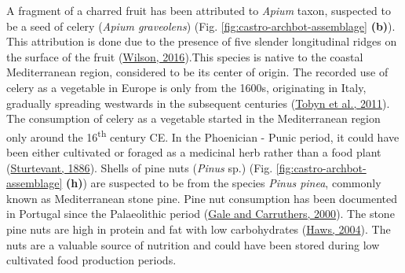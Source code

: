 \documentclass[preprint, 3p, authoryear]{elsarticle} %
\begin{document}
A fragment of a charred fruit has been attributed to \emph{Apium} taxon, suspected to be a seed of celery (\emph{Apium graveolens}) (Fig. \ref{fig:castro-archbot-assemblage} \textbf{(b)}). This attribution is done due to the presence of five slender longitudinal ridges on the surface of the fruit (\protect\hyperlink{ref-wilson16}{Wilson, 2016}).This species is native to the coastal Mediterranean region, considered to be its center of origin. The recorded use of celery as a vegetable in Europe is only from the 1600s, originating in Italy, gradually spreading westwards in the subsequent centuries (\protect\hyperlink{ref-tobyn_etal11}{Tobyn et al., 2011}). The consumption of celery as a vegetable started in the Mediterranean region only around the 16\textsuperscript{th} century CE. In the Phoenician - Punic period, it could have been either cultivated or foraged as a medicinal herb rather than a food plant (\protect\hyperlink{ref-sturtevant86}{Sturtevant, 1886}). Shells of pine nuts (\emph{Pinus} sp.) (Fig. \ref{fig:castro-archbot-assemblage} \textbf{(h)}) are suspected to be from the species \emph{Pinus pinea}, commonly known as Mediterranean stone pine. Pine nut consumption has been documented in Portugal since the Palaeolithic period (\protect\hyperlink{ref-gale_carruthers00}{Gale and Carruthers, 2000}). The stone pine nuts are high in protein and fat with low carbohydrates (\protect\hyperlink{ref-haws04}{Haws, 2004}). The nuts are a valuable source of nutrition and could have been stored during low cultivated food production periods.
\end{document}
